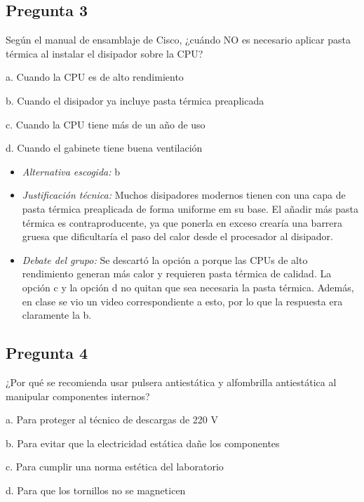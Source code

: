 \documentclass{article}
\begin{document}
\subsection{Pregunta 3}
\label{sec:orge2c428f}
Según el manual de ensamblaje de Cisco, ¿cuándo NO es necesario aplicar pasta térmica al instalar el disipador sobre la CPU?

a. Cuando la CPU es de alto rendimiento

b. Cuando el disipador ya incluye pasta térmica preaplicada

c. Cuando la CPU tiene más de un año de uso

d. Cuando el gabinete tiene buena ventilación

\begin{itemize}
\item \emph{Alternativa escogida:} b
\item \emph{Justificación técnica:} Muchos disipadores modernos tienen con una capa de pasta térmica preaplicada de forma uniforme em su base. El añadir más pasta térmica es contraproducente, ya que ponerla en exceso crearía una barrera gruesa que dificultaría el paso del calor desde el procesador al disipador.
\item \emph{Debate del grupo:} Se descartó la opción a porque las CPUs de alto rendimiento generan más calor y requieren pasta térmica de calidad. La opción c y la opción d no quitan que sea necesaria la pasta térmica. Además, en clase se vio un video correspondiente a esto, por lo que la respuesta era claramente la b.
\end{itemize}

\subsection{Pregunta 4}
\label{sec:orga2666bf}
¿Por qué se recomienda usar pulsera antiestática y alfombrilla antiestática al manipular componentes internos?

a. Para proteger al técnico de descargas de 220 V

b. Para evitar que la electricidad estática dañe los componentes

c. Para cumplir una norma estética del laboratorio

d. Para que los tornillos no se magneticen
\end{document}
